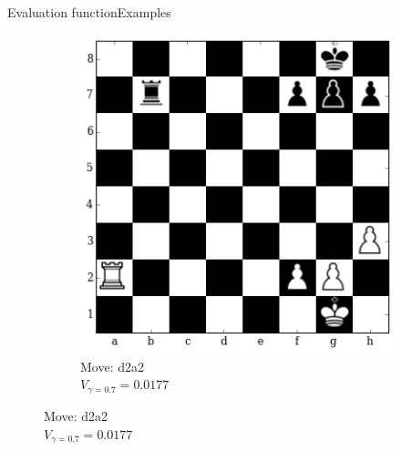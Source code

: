 \documentclass[9pt, unknownkeysallowed]{beamer}
\begin{document}
\begin{frame}{Evaluation function}{Examples}
{\begin{figure}[H]
\begin{subfigure}[t]{0.3\textwidth}
    \includegraphics[width=\textwidth]{../img/table_evaluations/output_12_4.png}
        \caption{Move: d2a2\\
        $V_{\gamma=0.7}=0.0177$}
    \end{subfigure}
\end{figure}
}
\end{frame}
\end{document}

